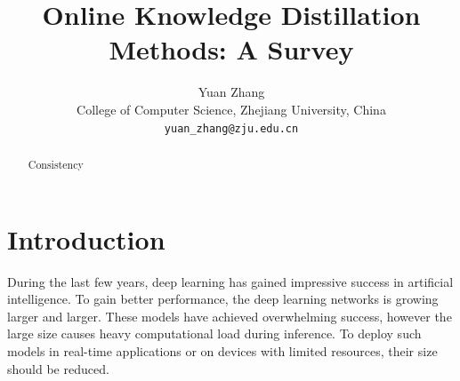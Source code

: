 \documentclass[10pt,twocolumn,letterpaper]{article}
\begin{document}
\title{Online Knowledge Distillation Methods: A Survey}

\author{Yuan Zhang\\
College of Computer Science, Zhejiang University, China\\
{\tt\small yuan\_zhang@zju.edu.cn}
}

\maketitle

\begin{abstract}
   Consistency 
\end{abstract}

\section{Introduction}
During the last few years, deep learning has gained impressive success
in artificial intelligence. To gain better performance, the deep learning networks
is growing larger and larger. These models have achieved overwhelming
success, however the large size causes heavy computational load during inference. To
deploy such models in real-time applications or on devices with limited resources,
their size should be reduced.
\end{document}
